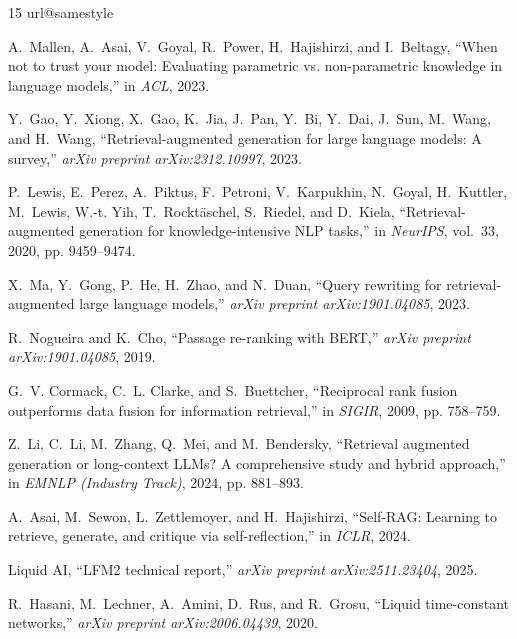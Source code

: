\documentclass[conference]{IEEEtran}
\begin{document}
\begin{thebibliography}{15}
\providecommand{\url}[1]{#1}
\csname url@samestyle\endcsname
\providecommand{\newblock}{\relax}
\providecommand{\bibinfo}[2]{#2}
\providecommand{\openaccess}[1]{#1}

A.~Mallen, A.~Asai, V.~Goyal, R.~Power, H.~Hajishirzi, and I.~Beltagy, ``When not to trust your model: Evaluating parametric vs. non-parametric knowledge in language models,'' in \emph{ACL}, 2023.

Y.~Gao, Y.~Xiong, X.~Gao, K.~Jia, J.~Pan, Y.~Bi, Y.~Dai, J.~Sun, M.~Wang, and H.~Wang, ``Retrieval-augmented generation for large language models: A survey,'' \emph{arXiv preprint arXiv:2312.10997}, 2023.

P.~Lewis, E.~Perez, A.~Piktus, F.~Petroni, V.~Karpukhin, N.~Goyal, H.~Kuttler, M.~Lewis, W.-t. Yih, T.~Rockt{\"a}schel, S.~Riedel, and D.~Kiela, ``Retrieval-augmented generation for knowledge-intensive {NLP} tasks,'' in \emph{NeurIPS}, vol.~33, 2020, pp. 9459--9474.

X.~Ma, Y.~Gong, P.~He, H.~Zhao, and N.~Duan, ``Query rewriting for retrieval-augmented large language models,'' \emph{arXiv preprint arXiv:1901.04085}, 2023.

R.~Nogueira and K.~Cho, ``Passage re-ranking with {BERT},'' \emph{arXiv preprint arXiv:1901.04085}, 2019.

G.~V. Cormack, C.~L. Clarke, and S.~Buettcher, ``Reciprocal rank fusion outperforms data fusion for information retrieval,'' in \emph{SIGIR}, 2009, pp. 758--759.

Z.~Li, C.~Li, M.~Zhang, Q.~Mei, and M.~Bendersky, ``Retrieval augmented generation or long-context {LLM}s? {A} comprehensive study and hybrid approach,'' in \emph{EMNLP (Industry Track)}, 2024, pp. 881--893.

A.~Asai, M.~Sewon, L.~Zettlemoyer, and H.~Hajishirzi, ``{Self-RAG}: Learning to retrieve, generate, and critique via self-reflection,'' in \emph{ICLR}, 2024.

{Liquid AI}, ``{LFM2} technical report,'' \emph{arXiv preprint arXiv:2511.23404}, 2025.

R.~Hasani, M.~Lechner, A.~Amini, D.~Rus, and R.~Grosu, ``Liquid time-constant networks,'' \emph{arXiv preprint arXiv:2006.04439}, 2020.


\end{thebibliography}
\end{document}
